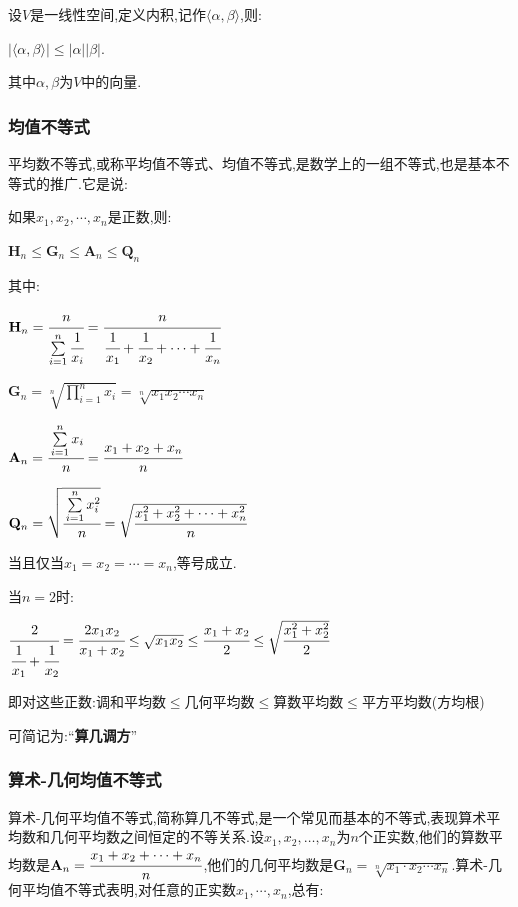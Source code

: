 \documentclass[UTF8,12pt]{ctexbook}
\newcommand{\upDownSum}[2]{\sum\limits_{#2}^{#1}}
\newcommand{\upDownProd}[2]{\prod\limits_{#2}^{#1}}
\newcommand{\innerProduct}[2]{\langle#1,#2\rangle}
\begin{document}
{{{{\begin{itemize}
{          设$V$是一线性空间,定义内积,记作$\innerProduct{\alpha}{\beta}$,则:

          $|\innerProduct{\alpha}{\beta}| \leq |\alpha||\beta|$.

          其中$\alpha,\beta$为$V$中的向量.
          }
  \end{itemize}
}%

\subsubsection{均值不等式}{
平均数不等式,或称平均值不等式、均值不等式,是数学上的一组不等式,也是基本不等式的推广.它是说:

如果$x_{1},x_{2},\dotsm,x_{n}$是正数,则:

$\mathbf{H}_n \leq \mathbf{G}_n \leq \mathbf{A}_n \leq \mathbf{Q}_n$

其中:

$\mathbf{H}_n = \cfrac{n}{\upDownSum{n}{i = 1}\cfrac{1}{x_i}} = \cfrac{n}{\cfrac{1}{x_1} + \cfrac{1}{x_2} + \dotsm + \cfrac{1}{x_n}}$

$\mathbf{G}_n = \sqrt[n]{\upDownProd{n}{i = 1}x_i} = \sqrt[n]{x_1x_2\dotsm x_n}$

$\mathbf{A}_n = \cfrac{\upDownSum{n}{i = 1}x_i}{n} = \cfrac{x_1 + x_2 + x_n}{n}$

$\mathbf{Q}_n = \sqrt{\cfrac{\upDownSum{n}{i = 1}x^2_i}{n}} = \sqrt{\cfrac{x^2_1 + x^2_2 + \dotsm + x^2_n}{n}}$

当且仅当$x_1 = x_2 = \dotsm = x_n$,等号成立.

当$n = 2$时:

$\cfrac{2}{\cfrac{1}{x_1} + \cfrac{1}{x_2}} = \cfrac{2x_1x_2}{x_1 + x_2}\leq\sqrt{x_1x_2}\leq\cfrac{x_1 + x_2}{2}\leq\sqrt{\cfrac{x_1^2 + x_2^2}{2}}$

即对这些正数:调和平均数$\leq$几何平均数$\leq$算数平均数$\leq$平方平均数(方均根)

可简记为:“{\bfseries 算几调方}”
}%

\subsubsection{算术-几何均值不等式}{
  算术-几何平均值不等式,简称算几不等式,是一个常见而基本的不等式,表现算术平均数和几何平均数之间恒定的不等关系.设$x_1,x_2,\dots,x_n$为$n$个正实数,他们的算数平均数是$\mathbf{A}_n = \cfrac{x_1 + x_2 + \dotsm + x_n}{n}$,他们的几何平均数是$\mathbf{G}_n = \sqrt[n]{x_1\cdot x_2 \dotsm x_n}$.算术-几何平均值不等式表明,对任意的正实数$x_1,\dotsm,x_n$,总有:

}}}}
\end{document}
